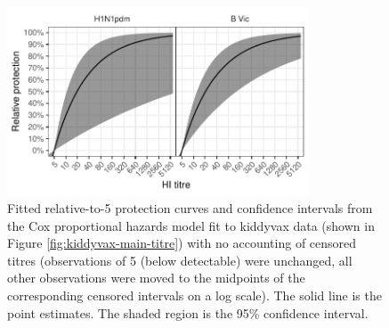 \documentclass[12pt]{article}
\begin{document}
\begin{figure}[htp]
	\centering
	\includegraphics[width=0.8\textwidth]{../fit-cox-plot/kiddyvaxmain.pdf}
	\caption{
	Fitted relative-to-5 protection curves and confidence intervals from the Cox proportional hazards model fit to kiddyvax data (shown in Figure \ref{fig:kiddyvax-main-titre}) with no accounting of censored titres (observations of 5 (below detectable) were unchanged, all other observations were moved to the midpoints of the corresponding censored intervals on a log scale). The solid line is the point estimates. The shaded region is the 95\% confidence interval.
	}
	\label{fig:kiddyvaxmain-cox}
\end{figure}
\end{document}
